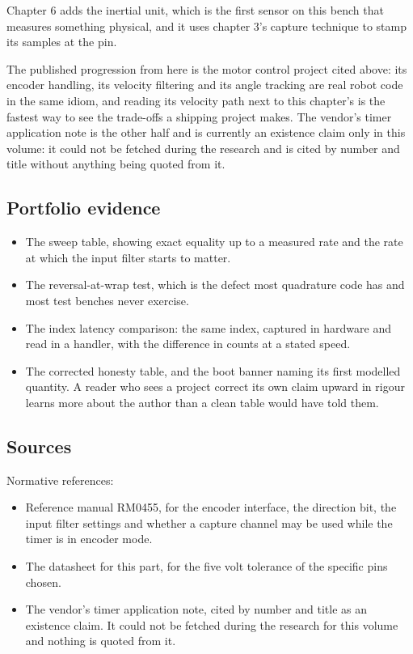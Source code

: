 Chapter 6 adds the inertial unit, which is the first sensor on this bench that
measures something physical, and it uses chapter 3's capture technique to stamp
its samples at the pin.

The published progression from here is the motor control project cited above:
its encoder handling, its velocity filtering and its angle tracking are real
robot code in the same idiom, and reading its velocity path next to this
chapter's is the fastest way to see the trade-offs a shipping project makes. The
vendor's timer application note is the other half and is currently an existence
claim only in this volume: it could not be fetched during the research and is
cited by number and title without anything being quoted from it.

\subsection*{Portfolio evidence}

\begin{itemize}
\item The sweep table, showing exact equality up to a measured rate and the rate
at which the input filter starts to matter.
\item The reversal-at-wrap test, which is the defect most quadrature code has
and most test benches never exercise.
\item The index latency comparison: the same index, captured in hardware and
read in a handler, with the difference in counts at a stated speed.
\item The corrected honesty table, and the boot banner naming its first modelled
quantity. A reader who sees a project correct its own claim upward in rigour
learns more about the author than a clean table would have told them.
\end{itemize}

\subsection*{Sources}

Normative references:
\begin{itemize}
\item Reference manual RM0455, for the encoder interface, the direction bit, the
input filter settings and whether a capture channel may be used while the timer
is in encoder mode.
\item The datasheet for this part, for the five volt tolerance of the specific
pins chosen.
\item The vendor's timer application note, cited by number and title as an
existence claim. It could not be fetched during the research for this volume and
nothing is quoted from it.
\end{itemize}

